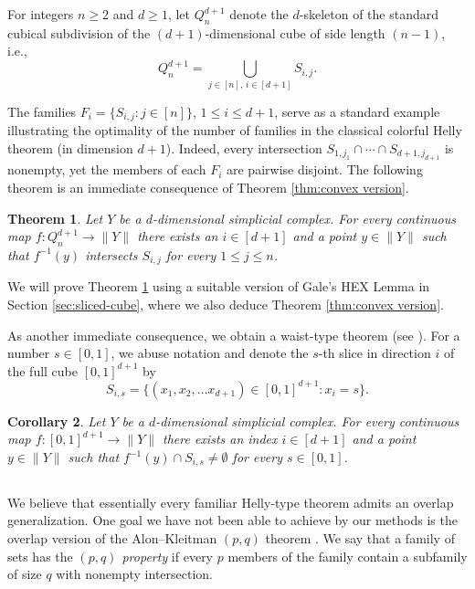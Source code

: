 \documentclass[12pt,a4paper,oneside]{amsart}\sloppy
\newtheorem{theorem}{Theorem}%
\newtheorem{corollary}[theorem]{Corollary}
\theoremstyle{definition}
\newcommand{\cubical}[2]{Q_{#1}^{#2}}
\newcommand{\slice}[2]{S_{#1,#2} }
\begin{document}
For integers $n \geq 2$ and $d \geq 1$, let $\cubical{n}{d+1}$ denote the $d$-skeleton of the standard cubical subdivision of the $(d+1)$-dimensional cube of side length $(n-1)$, i.e.,
\[ \cubical{n}{d+1} = \bigcup_{j\in [n],\, i\in [d+1]}\slice{i}{j}. \] 

The families $F_i = \{\slice{i}{j}  :  j \in [n]\}$, $1\leq i \leq d+1$, serve as a standard example illustrating the optimality of the number of families in the classical colorful Helly theorem (in dimension $d+1$). Indeed, every intersection $\slice{1}{j_1}\cap \cdots \cap \slice{d+1}{j_{d+1}}$ is nonempty, yet the members of each $F_i$ are pairwise disjoint. The following theorem is an immediate consequence of Theorem \ref{thm:convex version}.

\begin{theorem}\label{t:top col helly}
Let $Y$ be a $d$-dimensional simplicial complex. For every continuous map  $f \colon \cubical{n}{d+1} \to \|Y\|$ there exists an $i \in [d+1]$ and a point $y\in \|Y\|$ such that $f^{-1}(y)$ intersects $\slice{i}{j}$ for every $1\leq j\leq n$.
\end{theorem}

We will prove Theorem \ref{t:top col helly} using a suitable version of Gale's HEX Lemma \cite{Gale1979} in Section \ref{sec:sliced-cube}, where we also deduce Theorem \ref{thm:convex version}.

As another immediate consequence, we obtain a waist-type theorem (see \cite{roman-central, waists19}). For a number $s \in [0,1]$, we abuse notation and denote the $s$-th slice in direction $i$ of the full cube $[0,1]^{d+1}$  by \[\slice{i}{s}=\{(x_1,x_2, \ldots x_{d+1}) \in [0,1]^{d+1}: x_i=s\}.\]

\begin{corollary} \label{c:waist}
Let $Y$ be a $d$-dimensional simplicial complex. For every continuous map $f \colon [0,1]^{d+1} \to \|Y\|$ there exists an index $i \in [d+1]$ and a point $y\in \|Y\|$ such that $f^{-1}(y) \cap \slice{i}{s} \neq \emptyset$ for every $s\in [0,1]$. 
\end{corollary}

\subsection{}
We believe that essentially every familiar Helly-type theorem admits an overlap generalization. One goal we have not been able to achieve by our methods is the overlap version of the Alon--Kleitman $(p,q)$ theorem \cite{AlonKleitman1992}. 
We say that a family of sets has the \emph{$(p,q)$ property} if every $p$ members of the family contain a subfamily of size $q$ with nonempty intersection.
\end{document}
